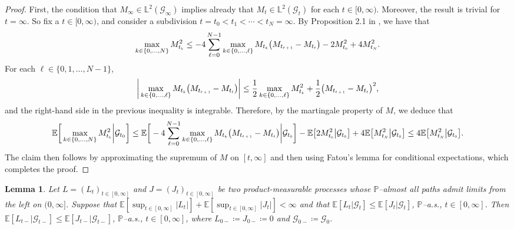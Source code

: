 \documentclass[10pt]{article} %
\newtheorem{lemma}[theorem]{Lemma}
\newcommand\cG{\mathcal G}
\newcommand{\smalltext}[1]{\text{\fontsize{4}{4}\selectfont$#1$}}
\def \E{\mathbb{E}}
\def \L{\mathbb{L}}
\def \P{\mathbb{P}}
\newcommand{\1}{\mathbf{1}}
\begin{document}
\begin{proof}
	First, the condition that $M_\infty \in \L^2(\cG_\infty)$ implies already that $M_t \in \L^2(\cG_t)$ for each $t \in [0,\infty)$. Moreover, the result is trivial for $t = \infty$. So fix a $t \in [0,\infty)$, and consider a subdivision $t = t_0 < t_1 < \cdots  < t_N = \infty$. By Proposition 2.1 in \cite{acciaio2013trajectorial}, we have that
	\begin{equation*}
		\max_{k \in \{0,\ldots,N\}} M^2_{t_\smalltext{k}} \leq -4 \sum_{\ell = 0}^{N-1}  \max_{k \in \{0,\ldots,\ell\}} M_{t_\smalltext{k}} \big(M_{t_\smalltext{\ell+1}} - M_{t_\smalltext{\ell}}\big) - 2 M^2_{t_\smalltext{0}} + 4 M^2_{t_\smalltext{N}}.
	\end{equation*}
	For each $\ell \in \{0,1,\ldots,N-1\}$,
	\begin{equation*}
		\bigg|\max_{k \in \{0,\ldots,\ell\}} M_{t_\smalltext{k}} \big(M_{t_\smalltext{\ell+1}} - M_{t_\smalltext{\ell}}\big)\bigg| \leq \frac{1}{2}\max_{k \in \{0,\ldots,\ell\}} M^2_{t_\smalltext{k}} + \frac{1}{2}\big(M_{t_\smalltext{\ell+1}} - M_{t_\smalltext{\ell}}\big)^2,
	\end{equation*}
	and the right-hand side in the previous inequality is integrable. Therefore, by the martingale property of $M$, we deduce that
	\begin{align*}
		\E\bigg[ \max_{k \in \{0,\ldots,N\}} M^2_{t_\smalltext{k}} \bigg| \cG_{t_0} \bigg] \leq \E\bigg[ -4 \sum_{\ell = 0}^{N-1}  \max_{k \in \{0,\ldots,\ell\}} M_{t_\smalltext{k}} \big(M_{t_\smalltext{\ell+1}} - M_{t_\smalltext{\ell}}\big) \bigg| \cG_{t_\smalltext{0}} \bigg] - \E\big[ 2 M^2_{t_\smalltext{0}} \big| \cG_{t_\smalltext{0}}\big] + 4 \E\big[ M^2_{t_\smalltext{N}} \big| \cG_{t_\smalltext{0}} \big] \leq 4 \E\big[ M^2_{t_\smalltext{N}} \big| \cG_{t_\smalltext{0}} \big].
	\end{align*}
	The claim then follows by approximating the supremum of $M$ on $[t,\infty]$ and then using Fatou's lemma for conditional expectations, which completes the proof.
\end{proof}


\begin{lemma}\label{lem::increas_cond_mean}
	Let $L = (L_t)_{t \in [0,\infty]}$ and $J = (J_t)_{t\in[0,\infty]}$ be two product-measurable processes whose $\P$--almost all paths admit limits from the left on $(0,\infty]$. Suppose that $\E[\sup_{t \in [0,\infty]}|L_t|] + \E[\sup_{t \in [0,\infty]}|J_t|] < \infty$ and that $\E[L_t|\cG_t] \leq \E[J_t|\cG_t]$, $\P$--a.s., $t \in [0,\infty]$. Then $\E[L_{t-}|\cG_{t-}] \leq \E[J_{t-}|\cG_{t-}]$, $\P$--a.s., $t \in [0,\infty]$, where $L_{0-} \coloneqq J_{0-} \coloneqq 0$ and $\cG_{0-} \coloneqq \cG_0$.
\end{lemma}
\end{document}
